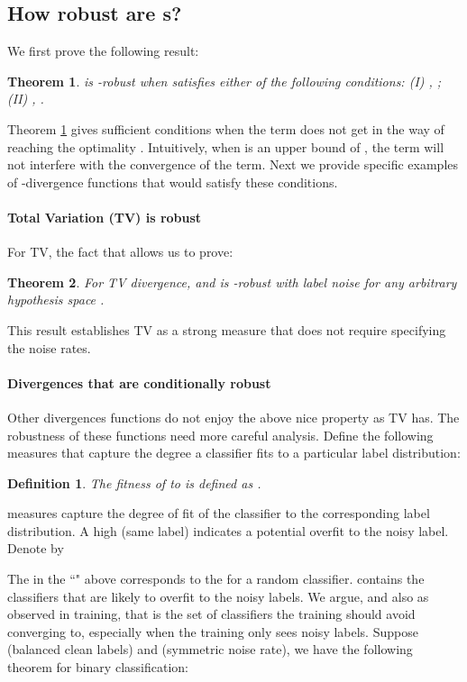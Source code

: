 \documentclass{article}
\newtheorem{theorem}{Theorem}
\newtheorem{definition}{Definition}
\begin{document}
\subsection{How robust are s?}\label{sec:robust}
We first prove the following result:
\begin{theorem}\label{thm:main}
  is -robust when  satisfies either of the following conditions: (I) , ; (II) , .\end{theorem}
\vspace{-0.05in}
Theorem \ref{thm:main} gives sufficient conditions when the  term does not get in the way of reaching the optimality . Intuitively, when  is an upper bound of , the  term will not interfere with the convergence of the  term.
Next we provide specific examples of -divergence functions that would satisfy these conditions.  

\paragraph{Total Variation (TV) is robust} For TV, the fact that  allows us to prove:

\begin{theorem}\label{thm:tv}
For TV divergence,  and  is -robust with label noise for any arbitrary hypothesis space . 
\end{theorem}
This result establishes TV as a strong measure that does not require specifying the noise rates.

\paragraph{Divergences that are conditionally robust}
Other divergences functions do not enjoy the above nice property as TV has. The robustness of these functions need more careful analysis. Define the following measures that capture the degree a classifier fits to a particular label distribution:
\begin{definition}The fitness of  to  is defined as .
\label{def: IM}
\end{definition}
 measures capture the degree of fit of the classifier to the corresponding label distribution. A high  (same label) 
indicates a potential overfit to the noisy label. Denote by 

The  in the ``" above corresponds to the  for a random classifier.  contains the classifiers that are likely to overfit to the noisy labels. We argue, and also as observed in training, that  is the set of classifiers the training should avoid converging to, especially when the training only sees noisy labels.
Suppose  (balanced clean labels) and  (symmetric noise rate), we have the following theorem for binary classification:
\end{document}
